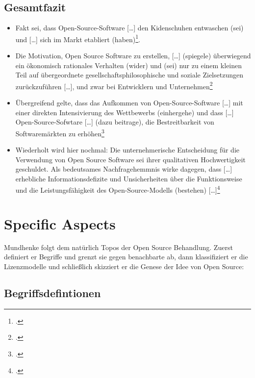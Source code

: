 \documentclass[DIV=calc,BCOR=5mm,11pt,headings=small,oneside,abstract=true, toc=bib]{scrartcl}
\begin{document}
\subsection{Gesamtfazit}
\begin{itemize}
  \item Fakt sei, dass \glqq{}Open-Source-Software [\ldots] den
  Kidenschuhen entwaschen (sei) und [\ldots] sich im Markt etabliert
  (haben)\grqq{}\footcite[vgl.][223]{Mundhenke2007a}.
  \item Die \glqq{}Motivation\grqq{}, Open Source Software zu erstellen,
  \glqq{}[\ldots] (spiegele) überwiegend ein ökonomisch rationales
  Verhalten (wider) und (sei) nur zu einem kleinen Teil auf übergeordnete
  gesellschaftsphilosophische und soziale Zielsetzungen zurückzuführen
  [\ldots]\grqq{}, und zwar bei Entwicklern und
  Unternehmen\footcite[vgl.][225]{Mundhenke2007a}
  \item Übergreifend gelte, dass \glqq{}das Aufkommen von
  Open-Source-Software [\ldots] mit einer direkten Intensivierung des
  Wettbewerbs (einhergehe)\grqq{} und dass \glqq{}[\ldots]
  Open-Source-Sofwtare [\ldots] (dazu beitrage), die Bestreitbarkeit von
  Softwaremärkten zu erhöhen\grqq{}\footcite[vgl.][225]{Mundhenke2007a}
  \item Wiederholt wird hier nochmal: Die unternehmerische
  Entscheidung für die Verwendung von Open Source Software sei ihrer
  \glqq{}qualitativen Hochwertigkeit\grqq{} geschuldet. Als
  \glqq{}bedeutsames Nachfragehemmnis\grqq{} wirke dagegen, dass \glqq{}[\ldots]
  erhebliche Informationsdefizite und Unsicherheiten über die
  Funktionsweise und die Leistungsfähigkeit des Open-Source-Modells
  (bestehen) [\ldots]\grqq{}\footcite[vgl.][227]{Mundhenke2007a}
\end{itemize}


\section{Specific Aspects}

Mundhenke folgt dem natürlich Topos der Open Source Behandlung. Zuerst definiert
er Begriffe und grenzt sie gegen benachbarte ab, dann klassifiziert er die
Lizenzmodelle und schließlich skizziert er die Genese der Idee von Open Source:

\subsection{Begriffsdefintionen}
\end{document}

